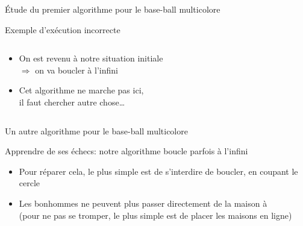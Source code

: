 \documentclass[final,hyperref={pdfpagelabels=false}]{beamer}
\renewenvironment{Coupe}{   }{   }
\begin{document}
\begin{Coupe}
\begin{frame}{Étude du premier algorithme pour le base-ball multicolore}
\begin{block}{Exemple d'exécution incorrecte}
\begin{columns}
      \begin{column}{.51\linewidth}
        \begin{itemize}
        \item On est revenu à notre situation initiale\\
          $\Rightarrow$ on va boucler à l'infini
        \item Cet algorithme ne marche pas ici, \\il faut chercher autre chose\ldots
        \end{itemize}
      \end{column}

    \end{columns}
  \end{block}
\end{frame}
\newcommand{\ligneMaison}[2]{
  \begin{tikzpicture}
    \foreach \x/\col in {#1} {
      \draw (.55*\x,.65) node[shape=circle,fill=\col,draw=black,inner sep=.1] {~~~};
    }
    \foreach \x/\col in {#2} {
      \draw (.55*\x,.3) node[shape=circle,fill=\col,draw=black,inner sep=.1] {~~~};
    }
    \foreach \x/\col in {1/A, 2/B, 3/C, 4/D, 5/E} {
      \draw (.55*\x,-.25) node[shape=ellipse,fill=\col,draw=black,rotate=90] {~~};
    }
  \end{tikzpicture}
}
\begin{frame}{Un autre algorithme pour le base-ball multicolore}
  \begin{block}{Apprendre de ses échecs: {\color{black}notre algorithme boucle parfois à l'infini}}
    \begin{itemize}\vspace{-.2\baselineskip}
    \item Pour réparer cela, le plus simple est de s'interdire de boucler, en
      coupant le cercle
    \item Les bonhommes ne peuvent plus passer directement de la maison
       à \\
      (pour ne pas se tromper, le plus simple est de placer les maisons en ligne)
    \end{itemize}

    \begin{columns}
      \begin{column}{.2\linewidth}
        ~
      \end{column}
      \begin{column}{.2\linewidth}\center
      \end{column}


\end{columns}
\end{block}
\end{frame}
\end{Coupe}
\end{document}
